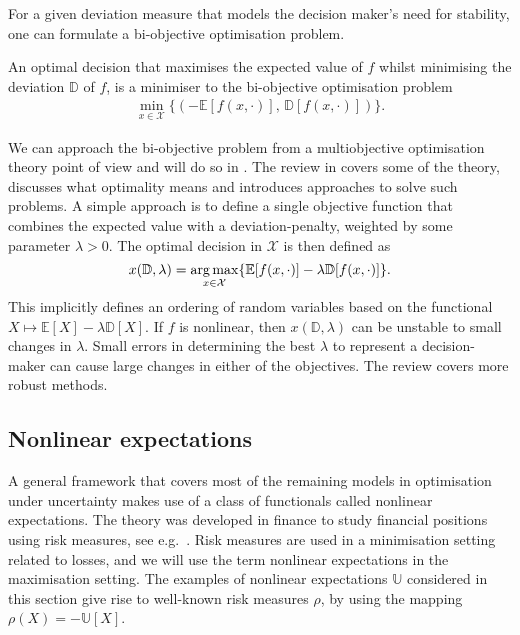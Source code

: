 \documentclass[main.tex]{subfiles}
\begin{document}
For a given deviation measure that models the decision maker's
need for stability, one can formulate a bi-objective optimisation
problem.
\begin{problem}
  An optimal decision that maximises the expected value of $f$ whilst
  minimising the deviation $\mathbb{D}$ of $f$, is a minimiser to the
  bi-objective optimisation problem
  \begin{align}
    \min_{x\in\mathcal{X}}\{(-\mathbb{E}[f(x,\cdot)],\,\mathbb{D}[f(x,\cdot)])\}.
  \end{align}
\end{problem}
We can approach the bi-objective problem from a multiobjective
optimisation theory point of view and will do so in
.
The review in \citep{marler2004survey} covers some of the theory,
discusses what optimality means and introduces approaches to solve
such problems.
A simple approach is to define a single objective function that combines
the expected value with a deviation-penalty, weighted by some
parameter $\lambda>0$. The optimal decision in $\mathcal{X}$ is then
defined as
\begin{equation}\label{eq:mean_dev_weighted}
  x(\mathbb{D},\lambda)=\operatorname*{arg\,max}_{x\in\mathcal{X}}\{\mathbb
  E[f(x,\cdot)]-\lambda \mathbb{D}[f(x,\cdot)]\}.
\end{equation}
This implicitly defines an ordering of random variables based on
the functional $X\mapsto \mathbb{E}[X]-\lambda \mathbb{D}[X]$.
If $f$ is nonlinear, then $x(\mathbb{D},\lambda)$ can be unstable to
small changes in $\lambda$. Small errors in determining the best
$\lambda$ to represent a decision-maker can cause large changes in
either of the objectives. The review \citep{marler2004survey} covers
more robust methods.

\subsection{Nonlinear expectations}\label{sec:nonlinear_expectations}
A general framework that covers most of the remaining models
in optimisation under uncertainty makes use of a class of functionals
called nonlinear expectations.
The theory was developed in finance to study financial positions using
risk measures, see
e.g.~\citep[Ch.~4]{follmer2004stochastic}.
Risk measures are used in a minimisation setting related to losses,
and we will use the term nonlinear expectations in the maximisation
setting. The examples of nonlinear expectations $\mathbb{U}$ considered
in this section give rise to well-known risk measures $\rho$, by using the mapping
$\rho(X) = -\mathbb{U}[X]$.
\end{document}
